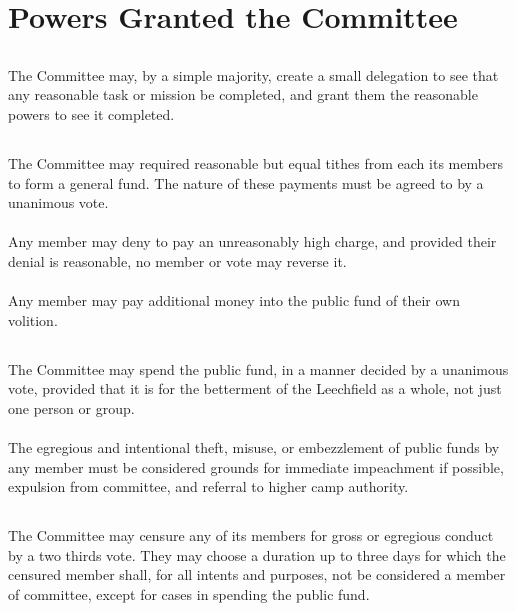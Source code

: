 \documentclass[6pt]{bill}
\begin{document}
	\section{Powers Granted the Committee}{
		\subsection{}{
			The Committee may, by a simple majority, create a small delegation to see that any reasonable task or mission be completed, and grant them the reasonable powers to see it completed.
		}
		\subsection{}{
			The Committee may required reasonable but equal tithes from each its members to form a general fund. The nature of these payments must be agreed to by a unanimous vote.
			\paragraph{}{
				Any member may deny to pay an unreasonably high charge, and provided their denial is reasonable, no member or vote may reverse it.
			}
			\paragraph{}{
				Any member may pay additional money into the public fund of their own volition.
			}
		}
		\subsection{}{
			The Committee may spend the public fund, in a manner decided by a unanimous vote, provided that it is for the betterment of the Leechfield as a whole, not just one person or group.
			\paragraph{}{
				The egregious and intentional theft, misuse, or embezzlement of public funds by any member must be considered grounds for immediate impeachment if possible, expulsion from committee, and referral to higher camp authority.
			}
		}
		\subsection{}{
			The Committee may censure any of its members for gross or egregious conduct by a two thirds vote. They may choose a duration up to three days for which the censured member shall, for all intents and purposes, not be considered a member of committee, except for cases in spending the public fund.
		}
}
\end{document}
